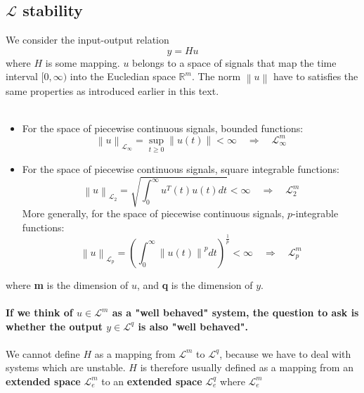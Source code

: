 \documentclass{article}
\begin{document}
\subsection{$\mathcal{L}$ stability}
We consider the input-output relation
\begin{equation}
	y = H u
	\label{eqn: i-o-relation}
\end{equation}
where $H$ is some mapping. $u$ belongs to a space of signals that map the time interval $[0, \infty )$ into the Eucledian space $\mathbb{R}^m$. The norm $\left\| u \right\| $ have to satisfies the same properties as introduced earlier in this text.
\\\\
\begin{itemize}
	\item For the space of piecewise continuous signals, bounded functions:
	\begin{equation}
		\left\| u \right\| _{\mathcal{L}_\infty } = \sup_{t \geq 0} \left\| u(t) \right\| < \infty \quad \Rightarrow  \quad \mathcal{L}^m_\infty
	\end{equation}
	\item For the space of piecewise continuous signals, square integrable functions:
	\begin{equation}
		\left\| u \right\|_{\mathcal{L}_2} = \sqrt{\int_{0}^{\infty} u^T(t) u(t) dt} < \infty \quad \Rightarrow  \quad \mathcal{L}^m_2
	\end{equation}
	More generally, for the space of piecewise continuous signals, $p$-integrable functions:
	\begin{equation}
		\left\| u \right\|_{\mathcal{L}_p} = \left( \int_{0}^{\infty} \left\| u(t) \right\|^p dt \right)^{\frac{1}{p}} < \infty \quad \Rightarrow  \quad \mathcal{L}^m_p
	\end{equation}
\end{itemize}
where \textbf{m} is the dimension of $u$, and \textbf{q} is the dimension of $y$. 
\\\\
\textbf{If we think of $u \in  \mathcal{L}^m$ as a "well behaved" system, the question to ask is whether the output $y \in \mathcal{L}^q$ is also "well behaved".}
\\\\
We cannot define $H$ as a mapping from $\mathcal{L}^m$ to $\mathcal{L}^q$, because we have to deal with systems which are unstable. $H$ is therefore usually defined as a mapping from an \textbf{extended space} $\mathcal{L}_e^m$ to an \textbf{extended space} $\mathcal{L}_e^q$ where $\mathcal{L}_e^m$
\end{document}
